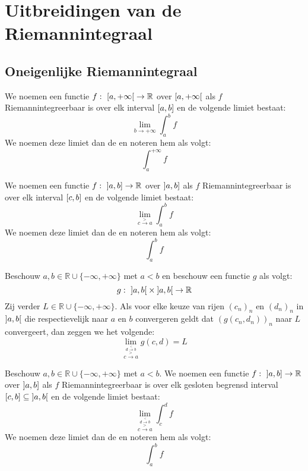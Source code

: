 \documentclass[main.tex]{subfiles}
\begin{document}
\section{Uitbreidingen van de Riemannintegraal}
\label{sec:uitbreidingen-van-de}

\subsection{Oneigenlijke Riemannintegraal}
\label{sec:oneig-riem}

\begin{de}
  We noemen een functie $f:\ \interval[open right]{a}{+\infty} \rightarrow \mathbb{R}$   over $\interval[open right]{a}{+\infty}$ als $f$ Riemannintegreerbaar is over elk interval $\interval{a}{b}$ en de volgende limiet bestaat:
  \[ \lim_{b\rightarrow +\infty}\int_{a}^{b}f \]
  We noemen deze limiet dan de  en noteren hem als volgt:
  \[ \int_{a}^{+\infty}f \]
\end{de}

\begin{de}
  We noemen een functie $f:\ \interval[open left]{a}{b} \rightarrow \mathbb{R}$   over $\interval[open left]{a}{b}$ als $f$ Riemannintegreerbaar is over elk interval $\interval{c}{b}$ en de volgende limiet bestaat:
  \[ \lim_{c\overset{>}{\rightarrow} a}\int_{a}^{b}f \]
  We noemen deze limiet dan de  en noteren hem als volgt:
  \[ \int_{a}^{b}f \]
\end{de}

\begin{de}
  Beschouw $a,b \in \mathbb{R} \cup \{ -\infty, +\infty \}$ met $a < b$ en beschouw een functie $g$ als volgt:
  \[ g:\ \interval[open]{a}{b} \times \interval[open]{a}{b} \rightarrow \mathbb{R} \]
  Zij verder $L \in \mathbb{R} \cup \{ -\infty, +\infty \}$.
  Als voor elke keuze van rijen $(c_{n})_{n}$ en $(d_{n})_{n}$ in $\interval[open]{a}{b}$ die respectievelijk naar $a$ en $b$ convergeren geldt dat $(g(c_{n},d_{n}))_{n}$ naar $L$ convergeert, dan zeggen we het volgende:
  \[ \lim_{\overset{d \overset{<}{\rightarrow} b}{c\overset{>}{\rightarrow} a}} g(c,d) = L \]
\end{de}

\begin{de}
  Beschouw $a,b\in \mathbb{R} \cup \{-\infty,+\infty\}$ met $a<b$.
  We noemen een functie $f:\ \interval[open left]{a}{b} \rightarrow \mathbb{R}$   over $\interval[open left]{a}{b}$ als $f$ Riemannintegreerbaar is over elk gesloten begrensd interval $\interval{c}{b} \subseteq \interval[open]{a}{b}$ en de volgende limiet bestaat:
  \[ \lim_{\overset{d \overset{<}{\rightarrow} b}{c\overset{>}{\rightarrow} a}}\int_{c}^{d}f \]
  We noemen deze limiet dan de  en noteren hem als volgt:
  \[ \int_{a}^{b}f \]
\end{de}
\end{document}
